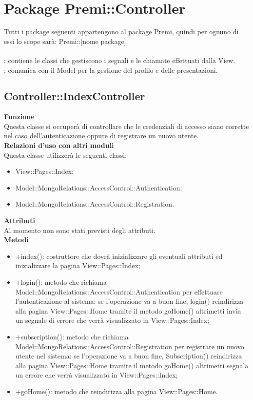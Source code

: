\section{Package Premi::Controller}{
		\label{sec:controller}
		Tutti i package seguenti appartengono al package Premi, quindi per ognuno di essi lo scope sarà: Premi::[nome package].\\\\
		\textbf{\tipo}: contiene le classi che gestiscono i segnali e le chiamate effettuati dalla View.\\
		\textbf{\relaz}: comunica con il Model per la gestione del profilo e delle presentazioni.\\
		\subsection{Controller::IndexController}{
				\label{sub:indexcontroller}
				\textbf{Funzione}\\
					\indent Questa classe si occuperà di controllare che le credenziali di accesso siano corrette nel caso dell'autenticazione oppure di registrare un nuovo utente.\\
				\textbf{Relazioni d'uso con altri moduli}\\
					\indent Questa classe utilizzerà le seguenti classi:
				\begin{itemize}
					\item View::Pages::Index;
					\item Model::MongoRelations::AccessControl::Authentication;
					\item Model::MongoRelations::AccessControl::Registration.
				\end{itemize}
				\textbf{Attributi}\\
					\indent Al momento non sono stati previsti degli attributi.\\
				\textbf{Metodi}
					\begin{itemize}
					\item +index(): costruttore che dovrà inizializzare gli eventuali attributi ed inizializzare la pagina View::Pages::Index;
					\item +login(): metodo che richiama Model::MongoRelations::AccessControl::Authentication per effettuare l'autenticazione al sistema: se l'operazione va a buon fine, login() reindirizza alla pagina View::Pages::Home tramite il metodo goHome() altrimetti invia un segnale di errore che verrà visualizzato in View::Pages::Index;
					\item +subscription(): metodo che richiama Model::MongoRelations::AccessControl::Registration per registrare un nuovo utente nel sistema: se l'operazione va a buon fine, Subscription() reindirizza alla pagina View::Pages::Home tramite il metodo goHome() altrimetti segnala un errore che verrà visualizzato in View::Pages::Index;
					\item +goHome(): metodo che reindirizza alla pagina View::Pages::Home.
				\end{itemize}
			}
}
